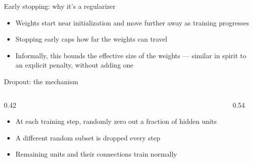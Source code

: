 \documentclass[aspectratio=169, 10pt]{beamer}
\begin{document}
\begin{frame}{Early stopping: why it's a regularizer}
  \begin{itemize}
    \item Weights start near initialization and move further away as training progresses
    \item Stopping early caps how far the weights can travel
    \item Informally, this bounds the effective size of the weights --- similar in spirit to an explicit penalty, without adding one
  \end{itemize}
\end{frame}

\begin{frame}{Dropout: the mechanism}
  \begin{columns}[c]
    \begin{column}{0.42\textwidth}
      \begin{itemize}
        \item At each training step, randomly zero out a fraction of hidden units
        \item A different random subset is dropped every step
        \item Remaining units and their connections train normally
      \end{itemize}
    \end{column}
    \begin{column}{0.54\textwidth}
      \begin{center}
      \end{center}
    \end{column}
  \end{columns}
\end{frame}
\end{document}
